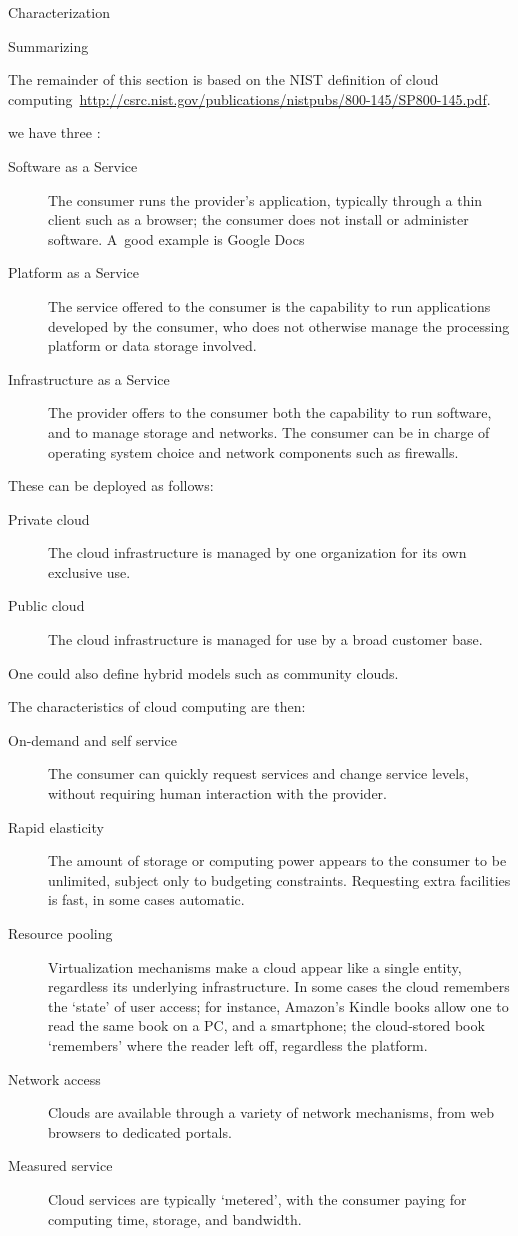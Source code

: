  {Characterization}

Summarizing
\begin{footnoteenv}
  {The remainder of this section is based on the
  NIST definition of cloud
  computing~\url{http://csrc.nist.gov/publications/nistpubs/800-145/SP800-145.pdf}.}
\end{footnoteenv}
we have three :
\begin{description}
  \item[Software as a Service] The consumer runs the provider's
    application, typically through a thin client such as a browser;
    the consumer does not install or administer software.
    A~good example is Google Docs
\item[Platform as a Service] The service offered to the consumer is
  the capability to run applications developed by the consumer, who
  does not otherwise manage the processing platform or data storage
  involved.
\item[Infrastructure as a Service] The provider offers to the consumer
  both the capability to run software, and to manage storage and
  networks. The consumer can be in charge of operating system choice
  and network components such as firewalls.
\end{description}
These can be deployed as follows:
\begin{description}
  \item[Private cloud] The cloud infrastructure is managed by one organization for its own exclusive use.
  \item[Public cloud] The cloud infrastructure is managed for use by a broad customer base.
\end{description}
One could also define hybrid models such as community clouds.

The characteristics of cloud computing are then:
\begin{description}
  \item[On-demand and self service] The consumer can quickly request services
    and change service levels, without requiring human interaction with the provider.
  \item[Rapid elasticity] The amount of storage or computing power appears to the consumer
    to be unlimited, subject only to budgeting constraints. Requesting extra facilities
    is fast, in some cases automatic.
  \item[Resource pooling] Virtualization mechanisms make a cloud
    appear like a single entity, regardless its underlying
    infrastructure. In some cases the cloud remembers the `state' of
    user access; for instance, Amazon's Kindle books allow one to read
    the same book on a PC, and a smartphone; the cloud-stored book
    `remembers' where the reader left off, regardless the platform.
  \item[Network access] Clouds are available through a variety of
    network mechanisms, from web browsers to dedicated portals.
  \item[Measured service] Cloud services are typically `metered', with the consumer
    paying for computing time, storage, and bandwidth.
\end{description}

